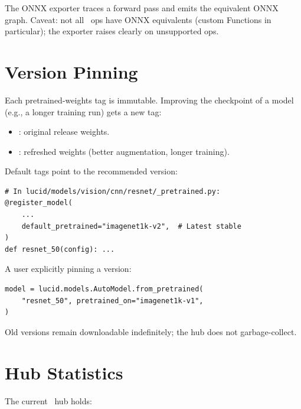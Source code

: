 The ONNX exporter traces a forward pass and emits the equivalent
ONNX graph. Caveat: not all \Lucid\ ops have ONNX equivalents
(custom Functions in particular); the exporter raises clearly
on unsupported ops.

\section{Version Pinning}
\label{sec:pretrained:version_pinning}

Each pretrained-weights tag is immutable. Improving the
checkpoint of a model (e.g., a longer training run) gets a new
tag:

\begin{itemize}
  \item {}: original release weights.
  \item {}: refreshed weights (better
    augmentation, longer training).
\end{itemize}

Default tags point to the recommended version:

\begin{lstlisting}[style=lucid,language=LucidPython]
# In lucid/models/vision/cnn/resnet/_pretrained.py:
@register_model(
    ...
    default_pretrained="imagenet1k-v2",  # Latest stable
)
def resnet_50(config): ...
\end{lstlisting}

A user explicitly pinning a version:

\begin{lstlisting}[style=lucid,language=LucidPython]
model = lucid.models.AutoModel.from_pretrained(
    "resnet_50", pretrained_on="imagenet1k-v1",
)
\end{lstlisting}

Old versions remain downloadable indefinitely; the hub does
not garbage-collect.

\section{Hub Statistics}
\label{sec:pretrained:hub_stats}

The current \Lucid\ hub holds:

